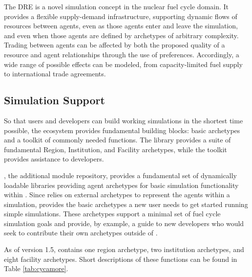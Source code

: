 The \gls{DRE} is a novel simulation concept in the nuclear fuel cycle domain. It
provides a flexible supply-demand infrastructure, supporting dynamic flows of
resources between agents, even as those agents enter and leave the simulation, and
even when those agents are defined by archetypes of arbitrary complexity. Trading
between agents can be affected by both the
proposed quality of a resource and agent relationships through the use of
preferences. Accordingly, a wide range of possible effects can be
modeled, from capacity-limited fuel supply to international trade agreements.

\subsection{Simulation Support}
So that users and developers can build working simulations in the shortest time
possible, the \Cyclus ecosystem provides fundamental building blocks: basic
archetypes and a toolkit of commonly needed functions.  The \Cycamore library
provides a suite of fundamental Region, Institution, and Facility archetypes,
while the \Cyclus toolkit provides assistance to developers.

\Cycamore \cite{carlsen_cycamore_2014}, the \Cyclus additional module
repository, provides a fundamental set of dynamically loadable libraries
providing agent archetypes for basic simulation
functionality within \Cyclus.  Since \Cyclus relies on external
archetypes to represent the agents within a simulation, \Cycamore provides the
basic archetypes a new user needs to get started running simple simulations.
These archetypes support a minimal set of fuel cycle simulation goals and
provide, by example, a guide to new developers who would seek to contribute
their own archetypes outside of \Cycamore.

As of version 1.5, \Cycamore contains one region archetype, two institution
archetypes, and eight facility archetypes. Short descriptions of these functions can be found in
Table \ref{tab:cycamore}.

